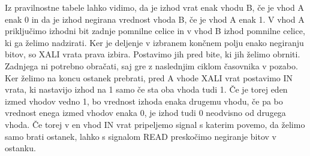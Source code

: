\documentclass[12pt]{article}
\begin{document}
        Iz pravilnostne tabele lahko vidimo, da je izhod vrat enak vhodu B, če 
        je vhod A enak 0 in da je izhod negirana vrednost vhoda B, če je vhod A 
        enak 1. V vhod A priključimo izhodni bit zadnje pomnilne celice in v 
        vhod B izhod pomnilne celice, ki ga želimo nadzirati. Ker je deljenje v
        izbranem končnem polju enako negiranju bitov, so XALI vrata prava izbira.
        Postavimo jih pred bite, ki jih želimo obrniti. Zadnjega ni potrebno
        obračati, saj gre z naslednjim ciklom časovnika v pozabo. 
        Ker želimo na koncu ostanek prebrati, pred A vhode XALI vrat postavimo
        IN vrata, ki nastavijo izhod na 1 samo če sta oba vhoda tudi 1. Če je 
        torej eden izmed vhodov vedno 1, bo vrednost izhoda enaka drugemu vhodu,
        če pa bo vrednost enega izmed vhodov enaka 0, je izhod tudi 0 neodvisno 
        od drugega vhoda. Če torej v en vhod IN vrat pripeljemo signal s katerim
        povemo, da želimo samo brati ostanek, lahko s signalom READ preskočimo
        negiranje bitov v ostanku. 

    \newpage
\end{document}
